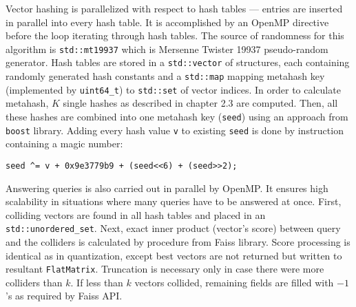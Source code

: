 Vector hashing is parallelized with respect to hash tables --- entries are inserted in parallel
into every hash table. It is accomplished by an OpenMP directive before the loop iterating through
hash tables.
The source of randomness for this algorithm is \texttt{std::mt19937} which is Mersenne
Twister 19937 pseudo-random generator.
Hash tables are stored in a \texttt{std::vector} of structures, each containing
randomly generated hash constants and a \texttt{std::map} mapping
metahash key (implemented by \texttt{uint64\_t}) to \texttt{std::set} of vector indices.
In order to calculate metahash, $K$ single hashes as described in chapter 2.3 are computed.
Then, all these hashes are combined into one metahash key (\texttt{seed}) using an approach from
\texttt{boost} library. Adding every hash value \texttt{v} to existing \texttt{seed} is done
by instruction containing a magic number:
\begin{verbatim}
seed ^= v + 0x9e3779b9 + (seed<<6) + (seed>>2);
\end{verbatim}

Answering queries is also carried out in parallel by OpenMP. It ensures high scalability in situations
where many queries have to be answered at once. First, colliding vectors are found in all hash
tables and placed in an \texttt{std::unordered\_set}. Next, exact inner product (vector's score)
between query and the colliders is calculated by  procedure from Faiss library.
Score processing is identical as in quantization, except best vectors are not returned but
written to resultant \texttt{FlatMatrix}. Truncation is necessary only in case there were more
colliders than $k$.
If less than $k$ vectors collided, remaining fields are filled with $-1$'s as required by
Faiss API.
\newpage
